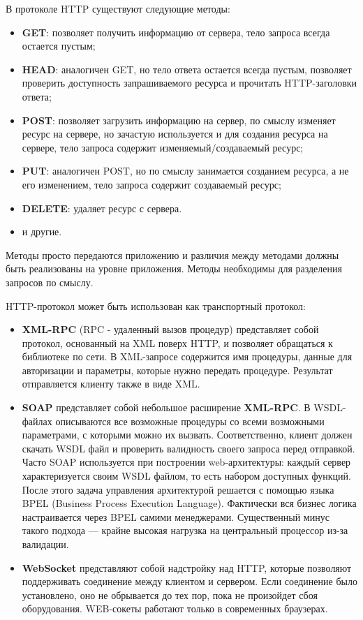В протоколе HTTP существуют следующие методы:
\begin{itemize}
  \item \textbf{GET}: позволяет получить информацию от сервера, тело запроса всегда остается пустым;
  \item \textbf{HEAD}: аналогичен GET, но тело ответа остается всегда пустым, позволяет проверить доступность запрашиваемого ресурса и прочитать HTTP-заголовки ответа;
  \item \textbf{POST}: позволяет загрузить информацию на сервер, по смыслу изменяет ресурс на сервере, но зачастую используется и для создания ресурса на сервере, тело запроса содержит изменяемый/создаваемый ресурс;
  \item \textbf{PUT}: аналогичен POST, но по смыслу занимается созданием ресурса, а не его изменением, тело запроса содержит создаваемый ресурс;
  \item \textbf{DELETE}: удаляет ресурс с сервера.
  \item и другие.
\end{itemize}
Методы просто передаются приложению и различия между методами должны быть реализованы на уровне приложения. Методы необходимы для разделения запросов по смыслу.

HTTP-протокол может быть использован как транспортный протокол:
\begin{itemize}
  \item \textbf{XML-RPC} (RPC - удаленный вызов процедур) представляет собой протокол, основанный на XML поверх HTTP, и позволяет обращаться к библиотеке по сети. В XML-запросе содержится имя процедуры, данные для авторизации и параметры, которые нужно передать процедуре. Результат отправляется клиенту также в виде XML.

  \item \textbf{SOAP} представляет собой небольшое расширение \textbf{XML-RPC}. В WSDL-файлах описываются все возможные процедуры со всеми возможными параметрами, с которыми можно их вызвать. Соответственно, клиент должен скачать WSDL файл и проверить валидность своего запроса перед отправкой. Часто SOAP используется при построении web-архитектуры: каждый сервер характеризуется своим WSDL файлом, то есть набором доступных функций. После этого задача управления архитектурой решается с помощью языка BPEL (Business Process Execution Language). Фактически вся бизнес логика настраивается через BPEL самими менеджерами. Существенный минус такого подхода --- крайне высокая нагрузка на центральный процессор из-за валидации.

  \item \textbf{WebSocket} представляют собой надстройку над HTTP, которые позволяют поддерживать соединение между клиентом и сервером. Если соединение было установлено, оно не обрывается до тех пор, пока не произойдет сбоя оборудования. WEB-сокеты работают только в современных браузерах.
\end{itemize}


